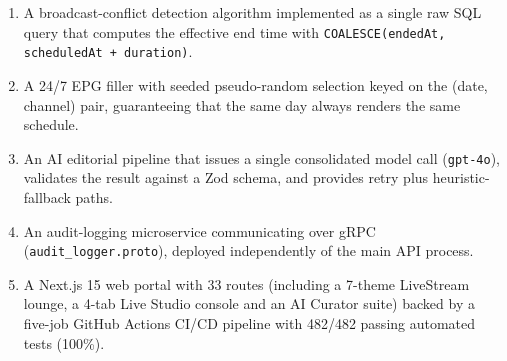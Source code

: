 {\begin{enumerate}[leftmargin=*,itemsep=2pt]
  \item A broadcast-conflict detection algorithm implemented as a
  single raw SQL query that computes the effective end time with
  \texttt{COALESCE(endedAt, scheduledAt + duration)}.
  \item A 24/7 EPG filler with seeded pseudo-random selection keyed on
  the (date, channel) pair, guaranteeing that the same day always
  renders the same schedule.
  \item An AI editorial pipeline that issues a single consolidated model
  call (\texttt{gpt-4o}), validates the result against a Zod schema,
  and provides retry plus heuristic-fallback paths.
  \item An audit-logging microservice communicating over gRPC (\texttt{audit\_logger.proto}), deployed
  independently of the main API process.
  \item A Next.js 15 web portal with 33 routes (including a 7-theme LiveStream lounge, a 4-tab Live Studio console and an AI Curator suite) backed by a five-job GitHub Actions CI/CD pipeline with 482/482 passing automated tests (100\%).
\end{enumerate}
}

\subsection{}



